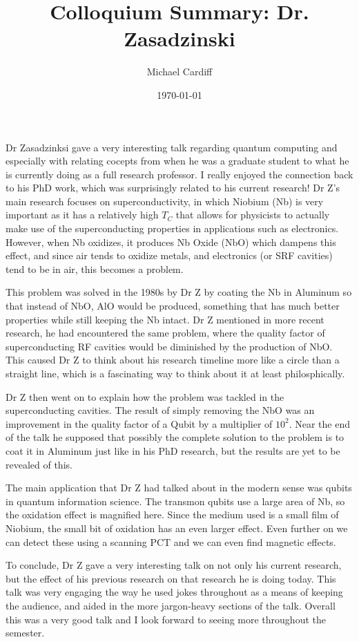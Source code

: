\documentclass[12pt]{article}
\title{Colloquium Summary: Dr. Zasadzinski}
\author{Michael Cardiff}
\date{\today}
\begin{document}
\maketitle
Dr Zasadzinksi gave a very interesting talk regarding quantum computing and especially with relating cocepts from when he was a graduate student to what he is currently doing as a full research professor. I really enjoyed the connection back to his PhD work, which was surprisingly related to his current research! Dr Z's main research focuses on superconductivity, in which Niobium (Nb) is very important as it has a relatively high $T_C$ that allows for physicists to actually make use of the superconducting properties in applications such  as electronics. However, when Nb oxidizes, it produces Nb Oxide (NbO) which dampens this effect, and since air tends to oxidize metals, and electronics (or SRF cavities) tend to be in air, this becomes a problem.

This problem was solved in the 1980s by Dr Z by coating the Nb in Aluminum so that instead of NbO, AlO would be produced, something that has much better properties while still keeping the Nb intact. Dr Z mentioned in more recent research, he had encountered the same problem, where the quality factor of superconducting RF cavities would be diminished by the production of NbO. This caused Dr Z to think about his research timeline more like a circle than a straight line, which is a fascinating way to think about it at least philosphically.

Dr Z then went on to explain how the problem was tackled in the superconducting cavities. The result of simply removing the NbO was an improvement in the quality factor of a Qubit by a multiplier of $10^2$. Near the end of the talk he supposed that possibly the complete solution to the problem is to coat it in Aluminum just like in his PhD research, but the results are yet to be revealed of this.

The main application that Dr Z had talked about in the modern sense was qubits in quantum information science. The transmon qubits use a large area of Nb, so the oxidation effect is magnified here. Since the medium used is a small film of Niobium, the small bit of oxidation has an even larger effect. Even further on we can detect these using a scanning PCT and we can even find magnetic effects.

To conclude, Dr Z gave a very interesting talk on not only his current research, but the effect of his previous research on that research he is doing today. This talk was very engaging the way he used jokes throughout as a means of keeping the audience, and aided in the more jargon-heavy sections of the talk. Overall this was a very good talk and I look forward to seeing more throughout the semester. 
\begin{equation}
  
\end{equation}
\end{document}
